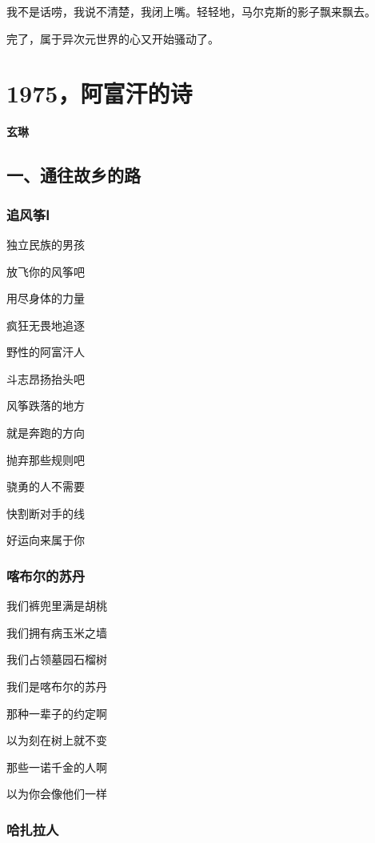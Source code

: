 \documentclass[openany,scheme = chinese, linespread = 1.5]{ctexbook}
\newcommand \name[1]{\begin{center} \kaishu \Large \bfseries #1 \end{center}}
\begin{document}
我不是话唠，我说不清楚，我闭上嘴。轻轻地，马尔克斯的影子飘来飘去。

完了，属于异次元世界的心又开始骚动了。

\newpage

\section{1975，阿富汗的诗}
\name{玄琳}
\subsection*{一、通往故乡的路}

\subsubsection*{追风筝Ⅰ}
\begin{center}
独立民族的男孩

放飞你的风筝吧

用尽身体的力量

疯狂无畏地追逐

野性的阿富汗人

斗志昂扬抬头吧

风筝跌落的地方

就是奔跑的方向

抛弃那些规则吧

骁勇的人不需要

快割断对手的线

好运向来属于你
\end{center}

\subsubsection*{喀布尔的苏丹}

\begin{center}
我们裤兜里满是胡桃

我们拥有病玉米之墙

我们占领墓园石榴树

我们是喀布尔的苏丹

那种一辈子的约定啊

以为刻在树上就不变

那些一诺千金的人啊

以为你会像他们一样
\end{center}

\subsubsection*{哈扎拉人}
\end{document}
